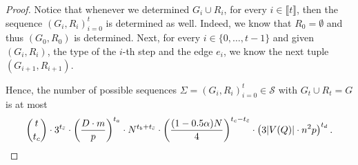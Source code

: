\documentclass[11pt,a4paper,oneside,reqno]{amsart}
\newcommand{\cS}{\mathcal{S}}
\newcommand{\1}{\mathbbm{1}} %
\newcommand{\br}[1]{\llbracket{#1}\rrbracket}
\begin{document}
\begin{proof}
    Notice that whenever we determined $G_i \cup R_i$, for every $i \in \br{t}$, then the sequence $(G_i, R_i)_{i=0}^{t}$ is determined as well. Indeed, we know that $R_0 = \emptyset$ and thus $(G_0, R_0)$ is determined. Next, for every $i \in \{0, \dots, t-1\}$ and given $(G_i, R_i)$, the type of the $i$-th step and the edge $e_i$, we know the next tuple $(G_{i+1}, R_{i+1})$.

    Hence, the number of possible sequences $\Sigma = (G_i, R_i)_{i=0}^{t} \in \cS$ with $G_t \cup R_t = G$ is at most
    \[
        \binom{t}{t_c} \cdot 3^{t_{\bar{c}}} \cdot \left(\frac{D \cdot m}{p}\right)^{t_a} \cdot N^{t_b + t_{\bar{c}}} \cdot \left(\frac{(1-0.5\alpha) N}{4}\right)^{t_c - t_{\bar{c}}} \cdot \left(3|V(Q)| \cdot n^2 p\right)^{t_d}.       \qedhere 
    \]
\end{proof}
\end{document}

